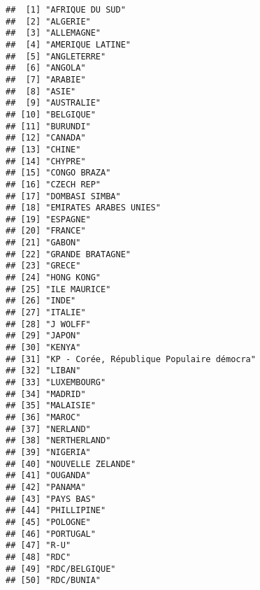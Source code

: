 \documentclass[
]{book}
\begin{document}
\begin{verbatim}
##  [1] "AFRIQUE DU SUD"                          
##  [2] "ALGERIE"                                 
##  [3] "ALLEMAGNE"                               
##  [4] "AMERIQUE LATINE"                         
##  [5] "ANGLETERRE"                              
##  [6] "ANGOLA"                                  
##  [7] "ARABIE"                                  
##  [8] "ASIE"                                    
##  [9] "AUSTRALIE"                               
## [10] "BELGIQUE"                                
## [11] "BURUNDI"                                 
## [12] "CANADA"                                  
## [13] "CHINE"                                   
## [14] "CHYPRE"                                  
## [15] "CONGO BRAZA"                             
## [16] "CZECH REP"                               
## [17] "DOMBASI SIMBA"                           
## [18] "EMIRATES ARABES UNIES"                   
## [19] "ESPAGNE"                                 
## [20] "FRANCE"                                  
## [21] "GABON"                                   
## [22] "GRANDE BRATAGNE"                         
## [23] "GRECE"                                   
## [24] "HONG KONG"                               
## [25] "ILE MAURICE"                             
## [26] "INDE"                                    
## [27] "ITALIE"                                  
## [28] "J WOLFF"                                 
## [29] "JAPON"                                   
## [30] "KENYA"                                   
## [31] "KP - Corée, République Populaire démocra"
## [32] "LIBAN"                                   
## [33] "LUXEMBOURG"                              
## [34] "MADRID"                                  
## [35] "MALAISIE"                                
## [36] "MAROC"                                   
## [37] "NERLAND"                                 
## [38] "NERTHERLAND"                             
## [39] "NIGERIA"                                 
## [40] "NOUVELLE ZELANDE"                        
## [41] "OUGANDA"                                 
## [42] "PANAMA"                                  
## [43] "PAYS BAS"                                
## [44] "PHILLIPINE"                              
## [45] "POLOGNE"                                 
## [46] "PORTUGAL"                                
## [47] "R-U"                                     
## [48] "RDC"                                     
## [49] "RDC/BELGIQUE"                            
## [50] "RDC/BUNIA"                               

\end{verbatim}
\end{document}
